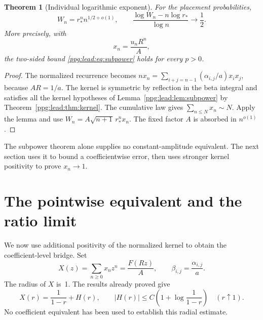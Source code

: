 \documentclass[11pt,letterpaper]{article}
\newtheorem{theorem}{Theorem}[section]
\theoremstyle{remark}\newtheorem{remark}[theorem]{Remark}
\numberwithin{equation}{section}
\begin{document}
\begin{theorem}[Individual logarithmic exponent]\label{ppg:lead:thm:subpower}
For the placement probabilities,
\begin{equation}\label{ppg:lead:eq:summarysubpower}
 W_n=r_*^n n^{1/2+o(1)},\qquad
 \frac{\log W_n-n\log r_*}{\log n}\longrightarrow\frac12.
\end{equation}
More precisely, with
\[
 x_n=\frac{u_nR^n}{A},
\]
the two-sided bound \eqref{ppg:lead:eq:subpower} holds for every $p>0$.
\end{theorem}
\begin{proof}
The normalized recurrence becomes
$nx_n=\sum_{i+j=n-1}(\alpha_{i,j}/a)x_ix_j$, because $AR=1/a$.
The kernel is symmetric by reflection in the beta integral and satisfies all the kernel hypotheses of Lemma~\ref{ppg:lead:lem:subpower} by Theorem~\ref{ppg:lead:thm:kernel}. The cumulative law gives $\sum_{n\le N}x_n\sim N$. Apply the lemma and use
$W_n=A\sqrt{n+1}\,r_*^nx_n$. The fixed factor $A$ is absorbed in $n^{o(1)}$.
\end{proof}

The subpower theorem alone supplies no constant-amplitude equivalent. The next section uses it to bound a coefficientwise error, then uses stronger kernel positivity to prove $x_n\to1$.


\section{The pointwise equivalent and the ratio limit}\label{ppg:lead:sec:pointwise}
We now use additional positivity of the normalized kernel to obtain the coefficient-level bridge. Set
\[
 X(z)=\sum_{n\ge0}x_nz^n=\frac{F(Rz)}A,\qquad
 \beta_{i,j}=\frac{\alpha_{i,j}}a.
\]
The radius of $X$ is~1. The results already proved give
\begin{equation}\label{ppg:lead:eq:Xreal}
 X(r)=\frac1{1-r}+H(r),\qquad
 |H(r)|\le C\left(1+\log\frac1{1-r}\right)\quad(r\uparrow1).
\end{equation}
No coefficient equivalent has been used to establish this radial estimate.
\end{document}
